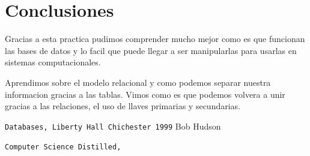 \documentclass[12pt, fleqn]{article}                             %
\begin{document}
\section{Conclusiones}

    Gracias a esta practica pudimos comprender mucho mejor como es que funcionan las bases de datos
    y lo facil que puede llegar a ser manipularlas para usarlas en sistemas computacionales.

    Aprendimos sobre el modelo relacional y como podemos separar nuestra informacion gracias a las tablas.
    Vimos como es que podemos volvera a unir gracias a las relaciones, el uso de llaves primarias y secundarias.






    \begin{thebibliography}{9}

        \texttt{Databases, Liberty Hall Chichester 1999}
        Bob Hudson

        \texttt{Computer Science Distilled,}


     

\end{thebibliography}
\end{document}
